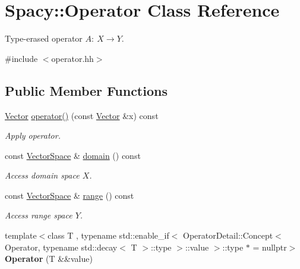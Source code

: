 \hypertarget{classSpacy_1_1Operator}{\section{Spacy\-:\-:Operator Class Reference}
\label{classSpacy_1_1Operator}
}


Type-\/erased operator $A:\ X \to Y $.  




{\ttfamily \#include $<$operator.\-hh$>$}

\subsection*{Public Member Functions}
\begin{DoxyCompactItemize}
\item 
\hypertarget{classSpacy_1_1Operator_a2ab6072d6f9d98e0d5590531c080e3ad}{\hyperlink{classSpacy_1_1Vector}{Vector} \hyperlink{classSpacy_1_1Operator_a2ab6072d6f9d98e0d5590531c080e3ad}{operator()} (const \hyperlink{classSpacy_1_1Vector}{Vector} \&x) const }\label{classSpacy_1_1Operator_a2ab6072d6f9d98e0d5590531c080e3ad}

\begin{DoxyCompactList}\small\item\em Apply operator. \end{DoxyCompactList}\item 
\hypertarget{classSpacy_1_1Operator_a3b3d457bee48adf00d683a6aec4aa841}{const \hyperlink{classSpacy_1_1VectorSpace}{Vector\-Space} \& \hyperlink{classSpacy_1_1Operator_a3b3d457bee48adf00d683a6aec4aa841}{domain} () const }\label{classSpacy_1_1Operator_a3b3d457bee48adf00d683a6aec4aa841}

\begin{DoxyCompactList}\small\item\em Access domain space $X$. \end{DoxyCompactList}\item 
\hypertarget{classSpacy_1_1Operator_a8cf3b1e3b6c5c6ab5ddc09224ed8ab24}{const \hyperlink{classSpacy_1_1VectorSpace}{Vector\-Space} \& \hyperlink{classSpacy_1_1Operator_a8cf3b1e3b6c5c6ab5ddc09224ed8ab24}{range} () const }\label{classSpacy_1_1Operator_a8cf3b1e3b6c5c6ab5ddc09224ed8ab24}

\begin{DoxyCompactList}\small\item\em Access range space $Y$. \end{DoxyCompactList}\item 
\hypertarget{classSpacy_1_1Operator_adfd4cdca1e6d705e9a52a6d3930c83d2}{{\footnotesize template$<$class T , typename std\-::enable\-\_\-if$<$ Operator\-Detail\-::\-Concept$<$ Operator, typename std\-::decay$<$ T $>$\-::type $>$\-::value $>$\-::type $\ast$  = nullptr$>$ }\\{\bfseries Operator} (T \&\&value)}\label{classSpacy_1_1Operator_adfd4cdca1e6d705e9a52a6d3930c83d2}


\end{DoxyCompactItemize}
